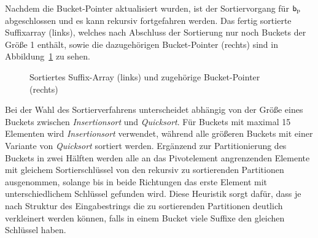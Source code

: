 \noindent Nachdem die Bucket-Pointer aktualisiert wurden, ist der Sortiervorgang für \(\mathsf{b}_{\textup{p}}\) abgeschlossen und es kann rekursiv fortgefahren werden. Das fertig sortierte Suffixarray (links), welches nach Abschluss der Sortierung nur noch Buckets der Größe 1 enthält, sowie die dazugehörigen Bucket-Pointer (rechts) sind in Abbildung~\ref{fig:buckets_final} zu sehen.\par\smallskip
\begin{figure}[ht]
	\caption[Sortiertes Suffix-Array und zugehörige Bucket-Pointer]{Sortiertes Suffix-Array (links) und zugehörige Bucket-Pointer (rechts)}
	\label{fig:buckets_final}
\end{figure}
Bei der Wahl des Sortierverfahrens unterscheidet \bpr abhängig von der Größe eines Buckets zwischen \emph{Insertionsort} und \emph{Quicksort}. Für Buckets mit maximal 15 Elementen wird \emph{Insertionsort} verwendet, während alle größeren Buckets mit einer Variante von \emph{Quicksort} sortiert werden. Ergänzend zur Partitionierung des Buckets in zwei Hälften werden alle an das Pivotelement angrenzenden Elemente mit gleichem Sortierschlüssel von den rekursiv zu sortierenden Partitionen ausgenommen, solange bis in beide Richtungen das erste Element mit unterschiedlichem Schlüssel gefunden wird. Diese Heuristik sorgt dafür, dass je nach Struktur des Eingabestrings die zu sortierenden Partitionen deutlich verkleinert werden können, falls in einem Bucket viele Suffixe den gleichen Schlüssel haben.\par\smallskip
